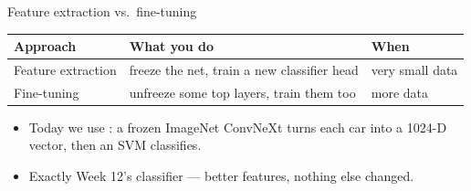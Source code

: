 \documentclass[10pt,aspectratio=169]{beamer}
\begin{document}
\begin{frame}{Feature extraction vs.\ fine-tuning}
  \begin{center}
  \begin{tabular}{@{}lll@{}}
    \toprule
    \textbf{Approach} & \textbf{What you do} & \textbf{When} \\
    \midrule
    Feature extraction & freeze the net, train a new classifier head & very small data \\
    Fine-tuning & unfreeze some top layers, train them too & more data \\
    \bottomrule
  \end{tabular}
  \end{center}
  \begin{itemize}
    \item Today we use : a frozen ImageNet ConvNeXt turns each
          car into a 1024-D vector, then an SVM classifies.
    \item Exactly Week 12's classifier — better features, nothing else changed.
  \end{itemize}
\end{frame}
\end{document}
